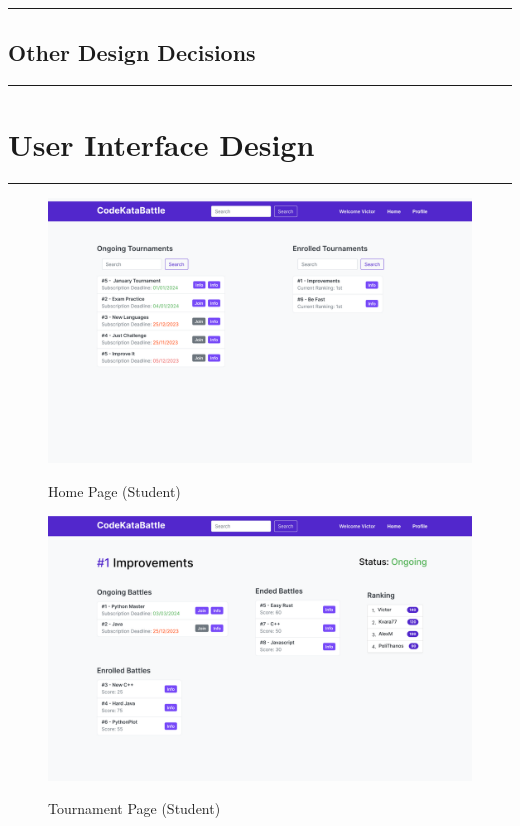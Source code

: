 \documentclass{Configuration_Files/Template}
\begin{document}
{\color{bluepoli}\rule{\linewidth}{0.1pt}}

\section{Other Design Decisions}

{\color{bluepoli}\rule{\linewidth}{0.1pt}}


\chapter{User Interface Design}

{\color{bluepoli}\rule{\linewidth}{0.1pt}}

\begin{figure}[H]
\centering
\includegraphics[scale = 0.25]{DD_latex/Images/UI/MainPage_Student.png}\\
\caption{Home Page (Student)}
\end{figure}

\begin{figure}[H]
\centering
\includegraphics[scale = 0.25]{DD_latex/Images/UI/TournamentPage_Student.png}\\
\caption{Tournament Page (Student)}
\end{figure}
\end{document}
